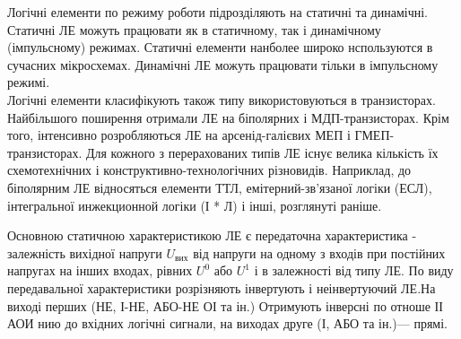 \documentclass[a4paper,14pt]{extreport}
\begin{document}
  Логічні елементи по режиму роботи підрозділяють на
  статичні та динамічні. Статичні ЛЕ можуть працювати як в статичному, так і динамічному (імпульсному) режимах. Статичні елементи нанболее широко нспользуются в сучасних мікросхемах. Динамічні ЛЕ можуть працювати тільки в імпульсному режимі.\\

  Логічні елементи класифікують також типу використовуються в транзисторах. Найбільшого поширення отримали ЛЕ на біполярних і МДП-транзисторах. Крім того, інтенсивно розробляються ЛЕ на арсенід-галієвих МЕП і ГМЕП-транзисторах. Для кожного з перерахованих типів ЛЕ існує велика кількість їх схемотехнічних і конструктивно-технологічних різновидів. Наприклад, до біполярним ЛЕ відносяться елементи ТТЛ, емітерний-зв'язаної логіки (ЕСЛ), інтегральної инжекционной логіки (І * Л) і інші, розглянуті раніше.


  \begin{figure}[!h]
  \end{figure}

  Основною статичною характеристикою ЛЕ є передаточна характеристика - залежність вихідної напруги  $U_{\text{вих}}$ від напруги на одному з входів при постійних напругах на інших входах, рівних $ U^0 $ або $ U^1 $
  і в залежності від типу ЛЕ. По виду передавальної характеристики розрізняють інвертують і неінвертуючий ЛЕ.На виході перших (НЕ, І-НЕ, АБО-НЕ
  ОІ та ін.) Отримують інверсні по отноше ІІ АОИ нию до вхідних логічні сигнали, на виходах друге (І, АБО та ін.)--- прямі.\\
\end{document}
